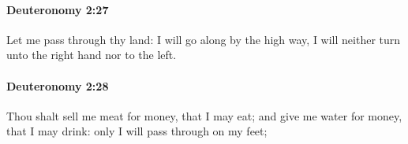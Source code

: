 		\paragraph{Deuteronomy 2:27} %
			\label{DEUTERONOMY-2-27}

			Let me pass through thy land: I will go along by the high way, I will neither turn unto the right hand nor to the left.


		\paragraph{Deuteronomy 2:28} %
			\label{DEUTERONOMY-2-28}

			Thou shalt sell me meat for money, that I may eat; and give me water for money, that I may drink: only I will pass through on my feet;


